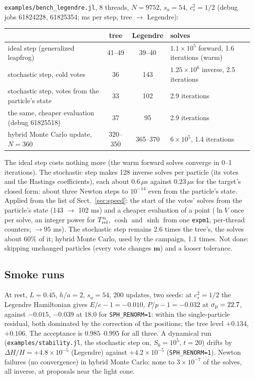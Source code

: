 \documentclass[11pt,aps,preprint,nofootinbib,superscriptaddress,tightenlines]{revtex4-2}
\def\Sect#1{Sect.~\ref{#1}}
\begin{document}
\nolinkurl{examples/bench_legendre.jl}, 8 threads, $N=9752$, $s_a=54$, $c_s^2=1/2$ (debug jobs 61824228, 61825354; ms per step, tree $\to$ Legendre):
\begin{center}
\small
\begin{tabular}{lccl}
\toprule
 & tree & Legendre & solves \\
\midrule
ideal step (generalized leapfrog) & 41--49 & 39--40 & $1.1\times10^5$ forward, 1.6 iterations (warm) \\
stochastic step, cold votes & 36 & 143 & $1.25\times10^6$ inverse, 2.5 iterations \\
stochastic step, votes from the particle's state & 33 & 102 & 2.9 iterations \\
the same, cheaper evaluation (debug 61825518) & 37 & 95 & 2.9 iterations \\
hybrid Monte Carlo update, $N=360$ & 320--350 & 365--370 & $6\times10^5$, 1.4 iterations \\
\bottomrule
\end{tabular}
\end{center}
The ideal step costs nothing more (the warm forward solves converge in 0--1 iterations).  The stochastic step makes 128 inverse solves per particle (its
votes and the Hastings coefficients), each about $0.6\,\mu$s against $0.23\,\mu$s for the target's closed form: about three Newton steps to $10^{-14}$ even
from the particle's state.  Applied from the list of \Sect{sec:speed}: the start of the votes' solves from the particle's state (143 $\to$ 102 ms) and a
cheaper evaluation of a point ($\ln V$ once per solve, an integer power for $T_{\rm rel}^n$, $\cosh$ and $\sinh$ from one \texttt{expm1}, per-thread counters;
$\to95$ ms).  The stochastic step remains 2.6 times the tree's, the solves about 60\% of it; hybrid Monte Carlo, used by the campaign, 1.1 times.  Not done:
skipping unchanged particles (every vote changes $\bm m$) and a looser tolerance.

\subsection{Smoke runs}

At rest, $L=0.45$, $h/a=2$, $s_a=54$, 200 updates, two seeds: at $c_s^2=1/2$ the Legendre Hamiltonian gives $E/e-1=-0.010$, $P/p-1=-0.032$ at
$\sigma_{\rm p}=22.7$, against $-0.015$, $-0.039$ at $18.0$ for \texttt{SPH\_RENORM=1}: within the single-particle residual, both dominated by the correction of
the positions; the tree level $+0.134$, $+0.106$.  The acceptance is $0.985$--$0.995$ for all three.  A dynamical run (\nolinkurl{examples/stability.jl}, the
stochastic step on, $S_0=10^5$, $t=20$) drifts by $\Delta H/H=+4.8\times10^{-5}$ (Legendre) against $+4.2\times10^{-5}$ (\texttt{SPH\_RENORM=1}).  Newton failures
(no convergence) in hybrid Monte Carlo: none to $3\times10^{-7}$ of the solves, all inverse, at proposals near the light cone.
\end{document}
